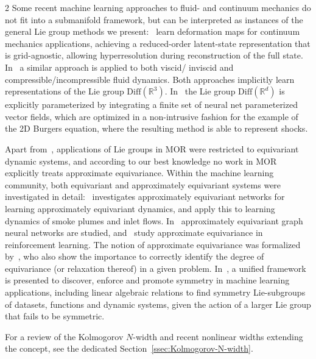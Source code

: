 \documentclass{article}
\newcommand{\R}{\mathbb{R}}                                 %
\newcommand{\Diff}{\mathrm{Diff}}
\begin{document}
\begin{multicols}{2}
Some recent machine learning approaches to fluid- and continuum mechanics do not fit into a submanifold framework, but can be interpreted as instances of the general Lie group methods we present:~\cite{Chen2023} learn deformation maps for continuum mechanics applications, achieving a reduced-order latent-state representation that is grid-agnostic, allowing hyperresolution during reconstruction of the full state. In~\cite{Cucchiara2024} a similar approach is applied to both viscid/ inviscid and compressible/incompressible fluid dynamics. Both approaches implicitly learn representations of the Lie group $\Diff(\R^3)$. In~\cite{Kleikamp2022} the Lie group $\Diff(\R^d)$ is explicitly parameterized by integrating a finite set of neural net parameterized vector fields, which are optimized in a non-intrusive fashion for the example of the 2D Burgers equation, where the resulting method is able to represent shocks.

Apart from~\cite{Kleikamp2022}, applications of Lie groups in MOR were restricted to equivariant dynamic systems, and according to our best knowledge no work in MOR explicitly treats approximate equivariance. Within the machine learning community, both equivariant and approximately equivariant systems were investigated in detail:~\cite{Wang2022} investigates approximately equivariant networks for learning approximately equivariant dynamics, and apply this to learning dynamics of smoke plumes and inlet flows. In~\cite{Huang2023} approximately equivariant graph neural networks are studied, and~\cite{Park2025} study approximate equivariance in reinforcement learning. The notion of approximate equivariance was formalized by~\cite{Petrache2023}, who also show the importance to correctly identify the degree of equivariance (or relaxation thereof) in a given problem. In~\cite{Otto2023}, a unified framework is presented to discover, enforce and promote symmetry in machine learning applications, including linear algebraic relations to find symmetry Lie-subgroups of datasets, functions and dynamic systems, given the action of a larger Lie group that fails to be symmetric. 

For a review of the Kolmogorov $N$-width and recent nonlinear widths extending the concept, see the dedicated Section~\ref{ssec:Kolmogorov-N-width}.



\end{multicols}
\end{document}
